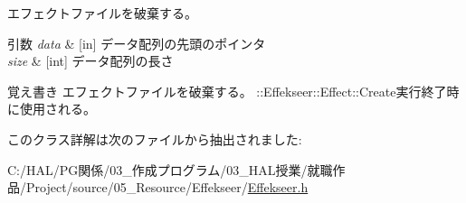 エフェクトファイルを破棄する。 


\begin{DoxyParams}{引数}
{\em data} & \mbox{[}in\mbox{]} データ配列の先頭のポインタ \\
\hline
{\em size} & \mbox{[}int\mbox{]} データ配列の長さ \\
\hline
\end{DoxyParams}
\begin{DoxyNote}{覚え書き}
エフェクトファイルを破棄する。 \+::\+Effekseer\+::\+Effect\+::\+Create実行終了時に使用される。 
\end{DoxyNote}


このクラス詳解は次のファイルから抽出されました\+:\begin{DoxyCompactItemize}
\item 
C\+:/\+H\+A\+L/\+P\+G関係/03\+\_\+作成プログラム/03\+\_\+\+H\+A\+L授業/就職作品/\+Project/source/05\+\_\+\+Resource/\+Effekseer/\mbox{\hyperlink{_effekseer_8h}{Effekseer.\+h}}\end{DoxyCompactItemize}
